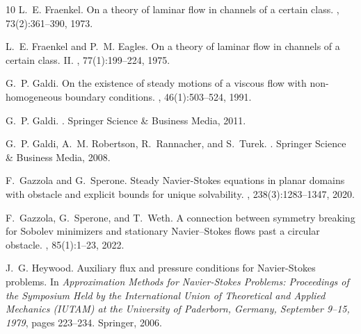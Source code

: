 \documentclass[11pt]{article}
\numberwithin{equation}{section}
\numberwithin{figure}{section}
\begin{document}
\begin{thebibliography}{10}
L.~E. Fraenkel.
\newblock On a theory of laminar flow in channels of a certain class.
, 73(2):361--390, 1973.

L.~E. Fraenkel and P.~M. Eagles.
\newblock On a theory of laminar flow in channels of a certain class. {II}.
, 77(1):199--224, 1975.

G.~P. Galdi.
\newblock On the existence of steady motions of a viscous flow with
  non-homogeneous boundary conditions.
, 46(1):503--524, 1991.

G.~P. Galdi.
.
\newblock Springer Science \& Business Media, 2011.

G.~P. Galdi, A.~M. Robertson, R.~Rannacher, and S.~Turek.
.
\newblock Springer Science \& Business Media, 2008.

F.~Gazzola and G.~Sperone.
\newblock Steady {N}avier-{S}tokes equations in planar domains with obstacle
  and explicit bounds for unique solvability.
, 238(3):1283--1347,
  2020.

F.~Gazzola, G.~Sperone, and T.~Weth.
\newblock A connection between symmetry breaking for {S}obolev minimizers and
  stationary {N}avier--{S}tokes flows past a circular obstacle.
, 85(1):1--23, 2022.


J.~G. Heywood.
\newblock Auxiliary flux and pressure conditions for {N}avier-{S}tokes
  problems.
\newblock In {\it Approximation Methods for Navier-Stokes Problems: Proceedings
  of the Symposium Held by the International Union of Theoretical and Applied
  Mechanics (IUTAM) at the University of Paderborn, Germany, September 9--15,
  1979}, pages 223--234. Springer, 2006.


\end{thebibliography}
\end{document}
